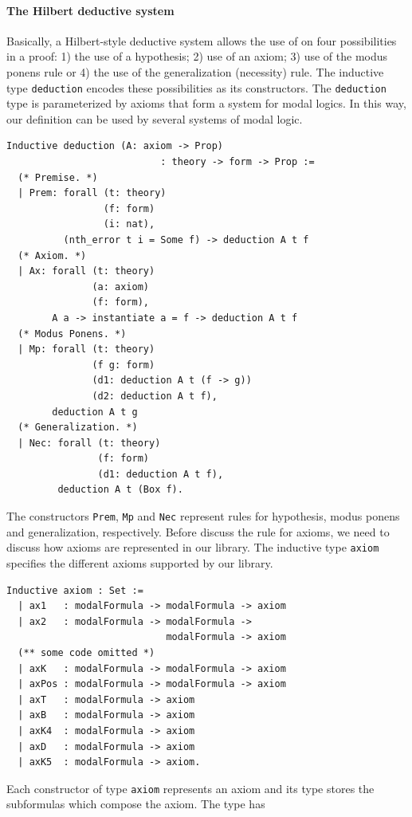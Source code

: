 \documentclass[sigconf]{acmart}
\begin{document}
\paragraph{The Hilbert deductive system}
Basically, a Hilbert-style deductive system allows the use of on four
possibilities in a proof: 1) the use of a hypothesis; 2) use of an axiom;
3) use of the modus ponens rule or 4) the use of the generalization (necessity)
rule. The inductive type \texttt{deduction} encodes these possibilities
as its constructors. The \texttt{deduction} type is parameterized by
axioms that form a system for modal logics. In this way, our definition can be
used by several systems of modal logic.
\begin{verbatim}
Inductive deduction (A: axiom -> Prop)
                           : theory -> form -> Prop :=
  (* Premise. *)
  | Prem: forall (t: theory)
                 (f: form)
                 (i: nat),
          (nth_error t i = Some f) -> deduction A t f
  (* Axiom. *)
  | Ax: forall (t: theory)
               (a: axiom)
               (f: form),
        A a -> instantiate a = f -> deduction A t f
  (* Modus Ponens. *)
  | Mp: forall (t: theory)
               (f g: form)
               (d1: deduction A t (f -> g))
               (d2: deduction A t f),
        deduction A t g
  (* Generalization. *)
  | Nec: forall (t: theory)
                (f: form)
                (d1: deduction A t f),
         deduction A t (Box f).
\end{verbatim}
The constructors \texttt{Prem}, \texttt{Mp} and \texttt{Nec}
represent rules for hypothesis, modus ponens and generalization, respectively.
Before discuss the rule for axioms, we need to discuss how axioms are
represented in our library. The inductive type \texttt{axiom} specifies
the different axioms supported by our library.
\begin{verbatim}
Inductive axiom : Set :=
  | ax1   : modalFormula -> modalFormula -> axiom
  | ax2   : modalFormula -> modalFormula ->
                            modalFormula -> axiom
  (** some code omitted *)
  | axK   : modalFormula -> modalFormula -> axiom
  | axPos : modalFormula -> modalFormula -> axiom
  | axT   : modalFormula -> axiom
  | axB   : modalFormula -> axiom
  | axK4  : modalFormula -> axiom
  | axD   : modalFormula -> axiom
  | axK5  : modalFormula -> axiom.
\end{verbatim}
Each constructor of type \texttt{axiom} represents an axiom and
its type stores the subformulas which compose the axiom. The type has
\end{document}
